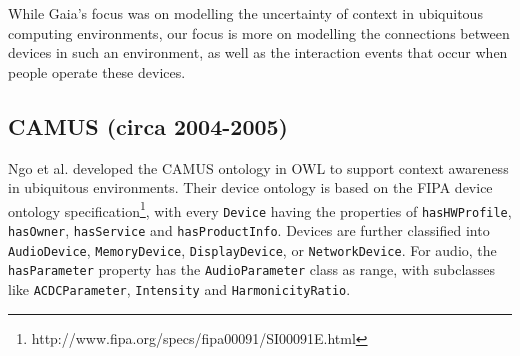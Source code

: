 


While Gaia's focus was on modelling the uncertainty of context in ubiquitous computing environments, our focus is more on modelling the connections between devices in such an environment, as well as the interaction events that occur when people operate these devices.



\subsection{CAMUS (circa 2004-2005)}

Ngo et al. \cite{Ngo2004} developed the \ac{CAMUS} ontology in \ac{OWL} to support context awareness in ubiquitous environments. Their device ontology is based on the \ac{FIPA} device ontology specification\footnote{http://www.fipa.org/specs/fipa00091/SI00091E.html}, with every \texttt{Device} having the properties of \texttt{hasHWProfile}, \texttt{hasOwner}, \texttt{has\-Service} and \texttt{hasProductInfo}. Devices are further classified into \texttt{AudioDevice}, \texttt{MemoryDevice}, \texttt{DisplayDevice}, or \texttt{NetworkDevice}. For audio, the \texttt{hasParameter} property has the \texttt{Audio\-Parameter} class as range, with subclasses like \texttt{ACDC\-Parameter}, \texttt{In\-ten\-si\-ty} and \texttt{Harmonicity\-Ratio}. %

